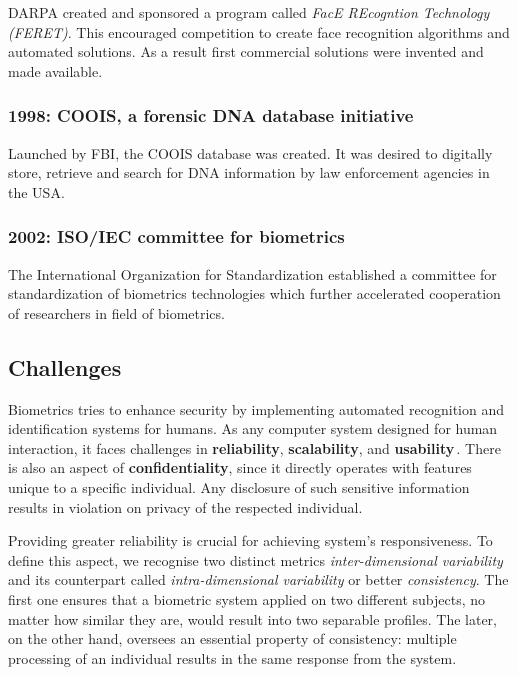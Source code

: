 DARPA created and sponsored a program called \textit{FacE REcogntion Technology (FERET)}. This encouraged competition to create face recognition algorithms and automated solutions. As a result first commercial solutions were invented and made available.

\subsubsection{1998: COOIS, a forensic DNA database initiative}

Launched by FBI, the COOIS database was created. It was desired to digitally store, retrieve and search for DNA information by law enforcement agencies in the USA.

\subsubsection{2002: ISO/IEC committee for biometrics}

The International Organization for Standardization established a committee for standardization of biometrics technologies which further accelerated cooperation of researchers in field of biometrics.

\subsection{Challenges}

Biometrics tries to enhance security by implementing automated recognition and identification systems for humans. As any computer system designed for human interaction, it faces challenges in \textbf{reliability}, \textbf{scalability}, and \textbf{usability}\,\cite{nodal_points}. There is also an aspect of \textbf{confidentiality}, since it directly operates with features unique to a specific individual. Any disclosure of such sensitive information results in violation on privacy of the respected individual.

Providing greater reliability is crucial for achieving system's responsiveness. To define this aspect, we recognise two distinct metrics \textit{inter-dimensional variability} and its counterpart called \textit{intra-dimensional variability} or better \textit{consistency}. The first one ensures that a biometric system applied on two different subjects, no matter how similar they are, would result into two separable profiles. The later, on the other hand, oversees an essential property of consistency: multiple processing of an individual results in the same response from the system.


